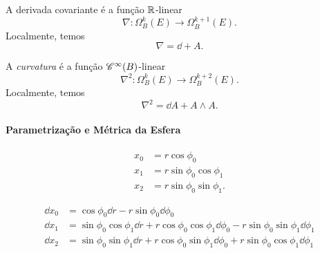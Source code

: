 \cleardoublepage


A derivada covariante é a função $\mathbb{R}$-linear
	\begin{equation*}
	\nabla\colon \Omega^k_B(E) \to \Omega^{k+1}_B(E).
	\end{equation*}
Localmente, temos
	\begin{equation*}
	\nabla = \dd + A.
	\end{equation*}

A \emph{curvatura} é a função $\mathscr{C}^\infty(B)$-linear
	\begin{equation*}
	\nabla^2\colon \Omega^k_B(E) \to \Omega^{k+2}_B(E).
	\end{equation*}
Localmente, temos
	\begin{equation*}
	\nabla^2 = \dd A + A \wedge A.
	\end{equation*}








































\cleardoublepage

\paragraph{Parametrização e Métrica da Esfera}

	\begin{align*}
	x_0 &= r\cos \phi_0 \\
	x_1 &= r\sin \phi_0 \cos \phi_1 \\
	x_2 &= r\sin \phi_0 \sin \phi_1.
	\end{align*}

	\begin{align*}
	\dd x_0 &= \cos \phi_0 \dd r - r\sin\phi_0 \dd\phi_0 \\
	\dd x_1 &= \sin \phi_0 \cos \phi_1 \dd r + r\cos \phi_0 \cos \phi_1 \dd\phi_0 - r\sin \phi_0 \sin \phi_1 \dd \phi_1 \\
	\dd x_2 &= \sin \phi_0 \sin \phi_1 \dd r + r\cos \phi_0 \sin \phi_1 \dd \phi_0 + r\sin \phi_0 \cos \phi_1 \dd \phi_1
	\end{align*}


